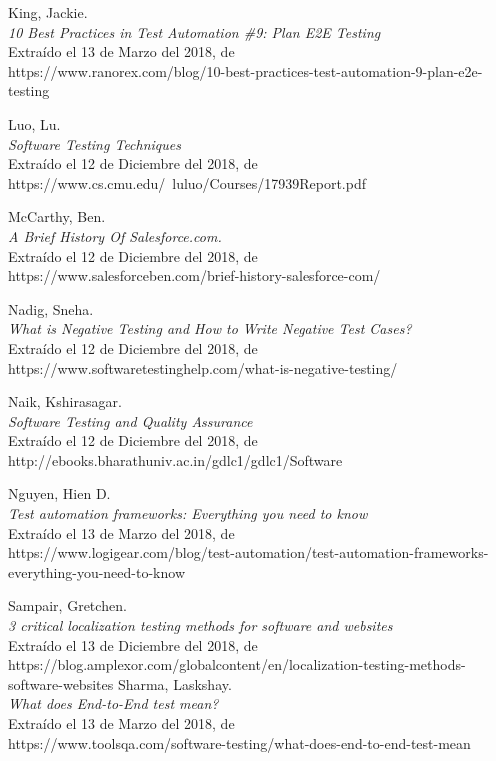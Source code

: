 \begin{thebibliography}{99}
 King, Jackie.\\
\emph{10 Best Practices in Test Automation \#9: Plan E2E Testing}\\
Extraído el 13 de Marzo del 2018, de\\
https://www.ranorex.com/blog/10-best-practices-test-automation-9-plan-e2e-testing

 Luo, Lu.\\
\emph{Software Testing Techniques}\\
Extraído el 12 de Diciembre del 2018, de\\
https://www.cs.cmu.edu/~luluo/Courses/17939Report.pdf

 McCarthy, Ben.\\
\emph{A Brief History Of Salesforce.com.}\\
Extraído el 12 de Diciembre del 2018, de\\
https://www.salesforceben.com/brief-history-salesforce-com/

 Nadig, Sneha.\\
\emph{What is Negative Testing and How to Write Negative Test Cases?}\\
Extraído el 12 de Diciembre del 2018, de\\
https://www.softwaretestinghelp.com/what-is-negative-testing/

 Naik, Kshirasagar.\\
\emph{Software Testing and Quality Assurance}\\
Extraído el 12 de Diciembre del 2018, de\\
http://ebooks.bharathuniv.ac.in/gdlc1/gdlc1/Software%

 Nguyen, Hien D.\\
\emph{Test automation frameworks: Everything you need to know}\\
Extraído el 13 de Marzo del 2018, de\\
https://www.logigear.com/blog/test-automation/test-automation-frameworks-everything-you-need-to-know

 Sampair, Gretchen.\\
\emph{3 critical localization testing methods for software and websites}\\
Extraído el 13 de Diciembre del 2018, de\\
https://blog.amplexor.com/globalcontent/en/localization-testing-methods-software-websites
 Sharma, Laskshay.\\
\emph{What does End-to-End test mean?}\\
Extraído el 13 de Marzo del 2018, de\\
https://www.toolsqa.com/software-testing/what-does-end-to-end-test-mean


\end{thebibliography}
